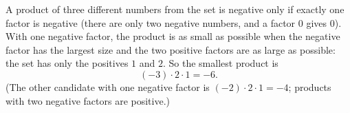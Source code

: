 A product of three different numbers from the set is negative only if exactly one factor is negative (there are only two negative numbers, and a factor $0$ gives $0$). With one negative factor, the product is as small as possible when the negative factor has the largest size and the two positive factors are as large as possible: the set has only the positives $1$ and $2$. So the smallest product is
\[
(-3)\cdot2\cdot1=\boxed{-6}.
\]
(The other candidate with one negative factor is $(-2)\cdot2\cdot1=-4$; products with two negative factors are positive.)
